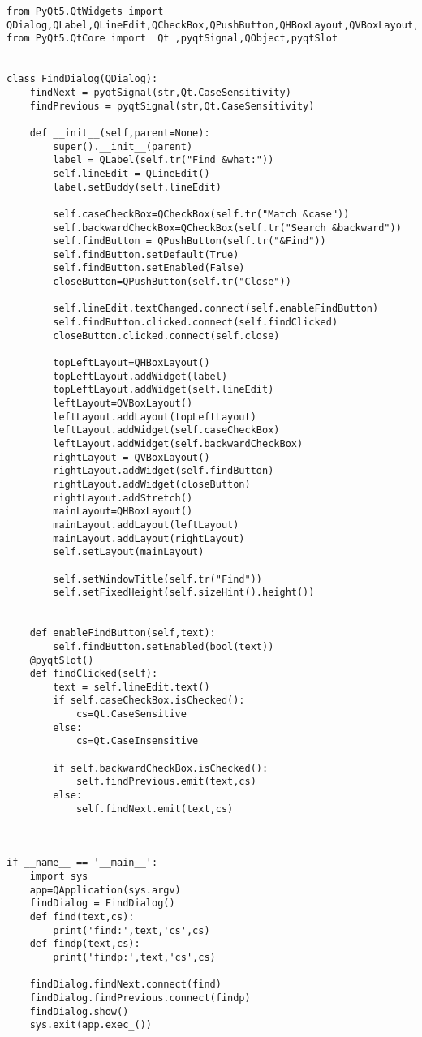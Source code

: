 \documentclass[11pt,oneside]{article}
\begin{document}
\begin{verbatim}
from PyQt5.QtWidgets import QDialog,QLabel,QLineEdit,QCheckBox,QPushButton,QHBoxLayout,QVBoxLayout,QApplication
from PyQt5.QtCore import  Qt ,pyqtSignal,QObject,pyqtSlot


class FindDialog(QDialog):
    findNext = pyqtSignal(str,Qt.CaseSensitivity)
    findPrevious = pyqtSignal(str,Qt.CaseSensitivity)

    def __init__(self,parent=None):
        super().__init__(parent)
        label = QLabel(self.tr("Find &what:"))
        self.lineEdit = QLineEdit()
        label.setBuddy(self.lineEdit)

        self.caseCheckBox=QCheckBox(self.tr("Match &case"))
        self.backwardCheckBox=QCheckBox(self.tr("Search &backward"))
        self.findButton = QPushButton(self.tr("&Find"))
        self.findButton.setDefault(True)
        self.findButton.setEnabled(False)
        closeButton=QPushButton(self.tr("Close"))

        self.lineEdit.textChanged.connect(self.enableFindButton)
        self.findButton.clicked.connect(self.findClicked)
        closeButton.clicked.connect(self.close)

        topLeftLayout=QHBoxLayout()
        topLeftLayout.addWidget(label)
        topLeftLayout.addWidget(self.lineEdit)
        leftLayout=QVBoxLayout()
        leftLayout.addLayout(topLeftLayout)
        leftLayout.addWidget(self.caseCheckBox)
        leftLayout.addWidget(self.backwardCheckBox)
        rightLayout = QVBoxLayout()
        rightLayout.addWidget(self.findButton)
        rightLayout.addWidget(closeButton)
        rightLayout.addStretch()
        mainLayout=QHBoxLayout()
        mainLayout.addLayout(leftLayout)
        mainLayout.addLayout(rightLayout)
        self.setLayout(mainLayout)

        self.setWindowTitle(self.tr("Find"))
        self.setFixedHeight(self.sizeHint().height())


    def enableFindButton(self,text):
        self.findButton.setEnabled(bool(text))
    @pyqtSlot()
    def findClicked(self):
        text = self.lineEdit.text()
        if self.caseCheckBox.isChecked():
            cs=Qt.CaseSensitive
        else:
            cs=Qt.CaseInsensitive

        if self.backwardCheckBox.isChecked():
            self.findPrevious.emit(text,cs)
        else:
            self.findNext.emit(text,cs)



if __name__ == '__main__':
    import sys
    app=QApplication(sys.argv)
    findDialog = FindDialog()
    def find(text,cs):
        print('find:',text,'cs',cs)
    def findp(text,cs):
        print('findp:',text,'cs',cs)

    findDialog.findNext.connect(find)
    findDialog.findPrevious.connect(findp)
    findDialog.show()
    sys.exit(app.exec_())
\end{verbatim}
\end{document}
